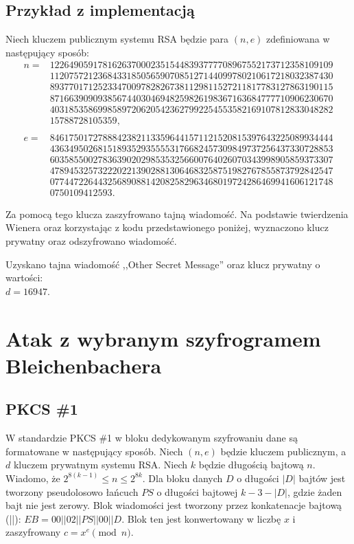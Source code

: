 \documentclass[12pt,twoside,a4]{mwbk}
\theoremstyle{definition}
\begin{document}
\subsection{Przykład z implementacją}
Niech kluczem publicznym systemu RSA będzie para $(n,e)$ zdefiniowana w następujący sposób:
\begin{align*}
n =
&12264905917816263700023515448393777708967552173712358109109 \\
&11207572123684331850565907085127144099780210617218032387430 \\
&89377017125233470097828267381129811527211817783127863190115 \\
&87166390909385674403046948259826198367163684777710906230670 \\
&40318535869985897206205423627992254553582169107812833048282 \\
&15788728105359, \\ \\
e = 
&84617501727888423821133596441571121520815397643225089934444 \\
&43634950268151893529355553176682457309849737256437330728853 \\
&60358550027836390202985353256600764026070343998905859373307 \\
&47894532573222022139028813064683258751982767855873792842547 \\
&07744722644325689088142082582963468019724286469941606121748 \\
&0750109412593.
\end{align*}

Za pomocą tego klucza zaszyfrowano tajną wiadomość. Na podstawie twierdzenia Wienera oraz korzystając z kodu przedstawionego poniżej, wyznaczono klucz prywatny oraz odszyfrowano wiadomość.



Uzyskano tajna wiadomość ,,Other Secret Message'' oraz klucz prywatny o wartości: \\

$d = 16947$.


\section{Atak z wybranym szyfrogramem Bleichenbachera}

\subsection{PKCS \#1 \cite{advances}}
W standardzie PKCS \#1 w bloku dedykowanym szyfrowaniu dane są formatowane w następujący sposób. Niech $(n,e)$ będzie kluczem publicznym, a $d$ kluczem prywatnym systemu RSA. Niech $k$ będzie długością bajtową $n$. Wiadomo, że $2^{8(k-1)} \leq n \leq 2^{8k}$. Dla bloku danych $D$ o długości $|D|$ bajtów jest tworzony pseudolosowo łańcuch $PS$ o długości bajtowej $k-3-|D|$, gdzie żaden bajt nie jest zerowy. Blok wiadomości jest tworzony przez konkatenacje bajtową (||): $EB = 00||02||PS||00||D$. Blok ten jest konwertowany w liczbę $x$ i zaszyfrowany $c = x^e \pmod n$. \\
\end{document}

